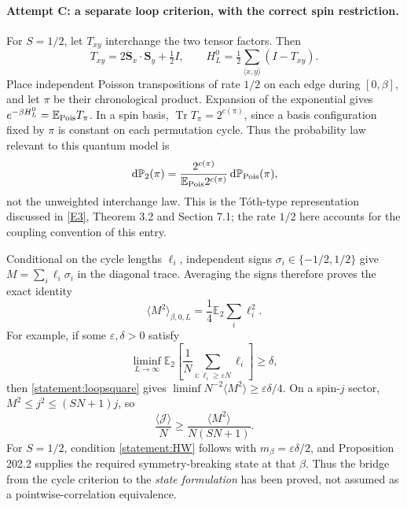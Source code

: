 \documentclass[11pt]{article}
\newcommand{\eps}{\varepsilon}
\newcommand{\dd}{\,\mathrm d}
\newcommand{\eref}[2]{\hyperlink{extra:#1:#2}{[E#2]}}
\begin{document}
	\paragraph{Attempt C: a separate loop criterion, with the correct spin restriction.}
	For $S=1/2$, let $T_{xy}$ interchange the two tensor factors. Then
	\[
	T_{xy}=2\mathbf S_x\cdot\mathbf S_y+\tfrac12I,
	\qquad H_L^0=\tfrac12\sum_{\langle x,y\rangle}(I-T_{xy}).
	\]
	Place independent Poisson transpositions of rate $1/2$ on each edge
	during $[0,\beta]$, and let $\pi$ be their chronological product.
	Expansion of the exponential gives
	$e^{-\beta H_L^0}=\mathbb E_{\rm Pois}T_\pi$.
	In a spin basis, $\operatorname{Tr}T_\pi=2^{c(\pi)}$, since a basis
	configuration fixed by $\pi$ is constant on each permutation cycle.
	Thus the probability law relevant to this quantum model is
	\begin{equation}\label{statement:looplaw}
		\dd\mathbb P_2(\pi)=
		\frac{2^{c(\pi)}}{\mathbb E_{\rm Pois}2^{c(\pi)}}
		\dd\mathbb P_{\rm Pois}(\pi),
	\end{equation}
	not the unweighted interchange law. This is the T\'oth-type
	representation discussed in \eref{statement}{3}, Theorem 3.2 and Section 7.1;
	the rate $1/2$ here accounts for the coupling convention of this entry.
	
	Conditional on the cycle lengths $\ell_i$, independent signs
	$\sigma_i\in\{-1/2,1/2\}$ give
	$M=\sum_i\ell_i\sigma_i$ in the diagonal trace. Averaging the signs
	therefore proves the exact identity
	\begin{equation}\label{statement:loopsquare}
		\langle M^2\rangle_{\beta,0,L}
		=\frac14\mathbb E_2\sum_i\ell_i^2.
	\end{equation}
	For example, if some $\eps,\delta>0$ satisfy
	\begin{equation}\label{statement:loopgoal}
		\liminf_{L\to\infty}\mathbb E_2
		\left[\frac1N\sum_{i:\ell_i\geq\eps N}\ell_i\right]\geq\delta,
	\end{equation}
	then \eqref{statement:loopsquare} gives
	$\liminf N^{-2}\langle M^2\rangle\geq\eps\delta/4$.
	On a spin-$j$ sector, $M^2\leq j^2\leq(SN+1)j$, so
	\[
	\frac{\langle\mathcal J\rangle}{N}
	\geq\frac{\langle M^2\rangle}{N(SN+1)}.
	\]
	For $S=1/2$, condition \eqref{statement:HW} follows with
	$m_\beta=\eps\delta/2$, and Proposition 202.2 supplies the required
	symmetry-breaking state at that $\beta$. Thus the bridge from the
	cycle criterion to the \emph{state formulation} has been proved, not
	assumed as a pointwise-correlation equivalence.
	
\end{document}
